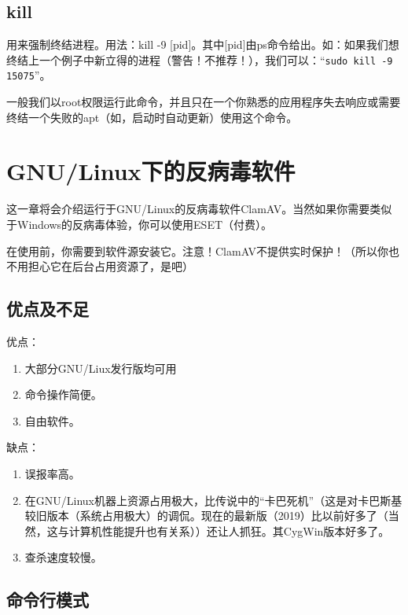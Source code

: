 \subsection{kill}
用来强制终结进程。用法：kill -9 [pid]。其中[pid]由ps命令给出。如：如果我们想终结上一个例子中新立得的进程（警告！不推荐！），我们可以：“\verb|sudo kill -9 15075|”。\par
一般我们以root权限运行此命令，并且只在一个你熟悉的应用程序失去响应或需要终结一个失败的apt（如，启动时自动更新）使用这个命令。{\color{red}{不要终结你不熟悉的进程，它可能是系统进程！}}
\section{GNU/Linux下的反病毒软件}
\label{sec:avgl}这一章将会介绍运行于GNU/Linux的反病毒软件ClamAV。当然如果你需要类似于Windows的反病毒体验，你可以使用ESET（付费）。\par
在使用前，你需要到软件源安装它。注意！ClamAV不提供实时保护！（所以你也不用担心它在后台占用资源了，是吧）
\subsection{优点及不足}
优点：
\begin{enumerate}
	\item 大部分GNU/Liux发行版均可用
	\item 命令操作简便。
	\item 自由软件。
\end{enumerate}
缺点：
\begin{enumerate}
	\item 误报率高。
	\item 在GNU/Linux机器上资源占用极大，比传说中的“卡巴死机”（这是对卡巴斯基较旧版本（系统占用极大）的调侃。现在的最新版（2019）比以前好多了（当然，这与计算机性能提升也有关系））还让人抓狂。其CygWin版本好多了。
	\item 查杀速度较慢。
\end{enumerate}
\subsection{命令行模式}
